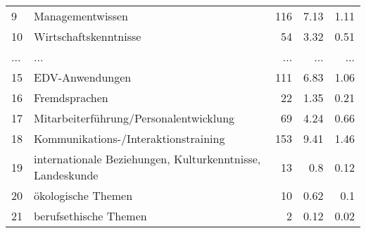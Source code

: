 \begin{longtable}{lXrrr}
        9 & \multicolumn{1}{X}{Managementwissen} & %
          \num{116} &
          \num[round-mode=places,round-precision=2]{7,13} &
          \num[round-mode=places,round-precision=2]{1,11} \\
        10 & \multicolumn{1}{X}{Wirtschaftskenntnisse} & %
          \num{54} &
          \num[round-mode=places,round-precision=2]{3,32} &
          \num[round-mode=places,round-precision=2]{0,51} \\
       ... & ... & ... & ... & ... \\
        15 & \multicolumn{1}{X}{EDV-Anwendungen} & %
          \num{111} &
          \num[round-mode=places,round-precision=2]{6,83} &
          \num[round-mode=places,round-precision=2]{1,06} \\

        16 & \multicolumn{1}{X}{Fremdsprachen} & %
          \num{22} &
          \num[round-mode=places,round-precision=2]{1,35} &
          \num[round-mode=places,round-precision=2]{0,21} \\

        17 & \multicolumn{1}{X}{Mitarbeiterführung/Personalentwicklung} & %
          \num{69} &
          \num[round-mode=places,round-precision=2]{4,24} &
          \num[round-mode=places,round-precision=2]{0,66} \\

        18 & \multicolumn{1}{X}{Kommunikations-/Interaktionstraining} & %
          \num{153} &
          \num[round-mode=places,round-precision=2]{9,41} &
          \num[round-mode=places,round-precision=2]{1,46} \\

        19 & \multicolumn{1}{X}{internationale Beziehungen, Kulturkenntnisse, Landeskunde} & %
          \num{13} &
          \num[round-mode=places,round-precision=2]{0,8} &
          \num[round-mode=places,round-precision=2]{0,12} \\

        20 & \multicolumn{1}{X}{ökologische Themen} & %
          \num{10} &
          \num[round-mode=places,round-precision=2]{0,62} &
          \num[round-mode=places,round-precision=2]{0,1} \\

        21 & \multicolumn{1}{X}{berufsethische Themen} & %
          \num{2} &
          \num[round-mode=places,round-precision=2]{0,12} &
          \num[round-mode=places,round-precision=2]{0,02} \\


\end{longtable}

